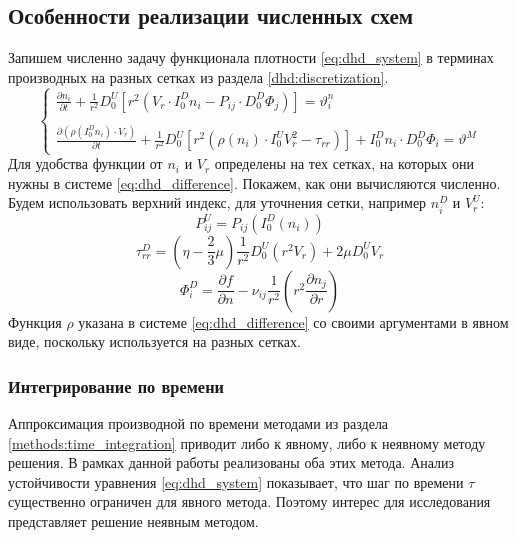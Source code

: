 \subsection{Особенности реализации численных схем \label{dhd:features}}
Запишем численно задачу функционала плотности \eqref{eq:dhd_system} в терминах производных на разных сетках из раздела \ref{dhd:discretization}. 
\begin{equation} \label{eq:dhd_difference}
\begin{cases}
\frac{\partial n_i}{\partial t} + \frac {1} {r^2} D^U_0 \left[ r^2 \left( V_r \cdot I^D_0 n_i - P_{ij} \cdot D^D_0 \Phi_j\right) \right] = \vartheta_{i}^{n}
\\ \\
\frac{\partial \left( \rho(I^D_0 n_i) \cdot V_r \right)}{\partial t} + \frac{1}{r^2} D^U_0 \left[ r^2 \left( \rho(n_i) \cdot I^U_0 V^2_r - \tau_{rr} \right) \right] + I^D_0 n_i \cdot D^D_0 \Phi_i = \vartheta^M
\end{cases}
\end{equation}
Для удобства функции от $n_i$ и $V_r$ определены на тех сетках, на которых они нужны в системе \eqref{eq:dhd_difference}. Покажем, как они вычисляются численно. Будем использовать верхний индекс, для уточнения сетки, например $n^D_i$ и $V_r^U$:
\begin{equation}
P_{ij}^U = P_{ij} \left( I^D_0(n_i) \right)
\end{equation}
\begin{equation}
\tau_{rr}^D = (\eta - \frac{2}{3} \mu) \frac{1}{r^2} D^U_0 \left( r^2 V_r \right) + 2 \mu D^U_0 V_r
\end{equation}
\begin{equation}
\Phi^D_i = \frac{\partial f}{\partial n} - \nu_{ij} \frac{1}{r^2} \left( r^2 \frac{\partial n_j}{\partial r} \right)
\end{equation}
Функция $\rho$ указана в системе \eqref{eq:dhd_difference} со своими аргументами в явном виде, поскольку используется на разных сетках.
\subsubsection*{Интегрирование по времени}
Аппроксимация производной по времени методами из раздела \ref{methods:time_integration} приводит либо к явному, либо к неявному методу решения. В рамках данной работы реализованы оба этих метода. Анализ устойчивости уравнения \eqref{eq:dhd_system} показывает, что шаг по времени $\tau$ существенно ограничен для явного метода. Поэтому интерес для исследования представляет решение неявным методом. 
